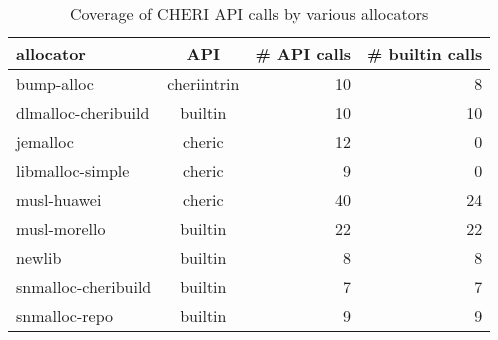 \begin{table}[t]
\begin{center}
\begin{tabular}{lcrr}
\toprule
allocator & API & \# API calls & \# builtin calls \\
\midrule
bump-alloc & cheriintrin & 10 & 8\\
dlmalloc-cheribuild & builtin & 10 & 10\\
jemalloc & cheric & 12 & 0\\
libmalloc-simple & cheric & 9 & 0\\
musl-huawei & cheric & 40 & 24\\
musl-morello & builtin & 22 & 22\\
newlib & builtin & 8 & 8\\
snmalloc-cheribuild & builtin & 7 & 7\\
snmalloc-repo & builtin & 9 & 9
\\ \bottomrule
\end{tabular}
\caption{\label{tab:rq1}Coverage of CHERI API calls by various allocators}
\label{tab:atks}
\end{center}
\end{table}